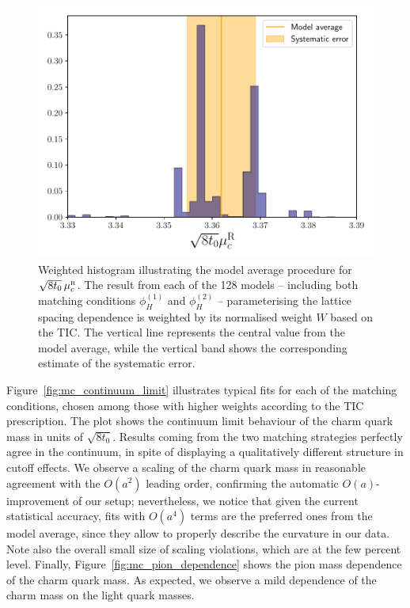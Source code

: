 \begin{figure}[!htb]
	\centering
	\includegraphics[scale=0.65]{./cap6/figs/mc/hist_muc.pdf}
	\caption{Weighted histogram illustrating the model average procedure for $\sqrt{8t_0}\,\mu_c^{\rm\scriptscriptstyle R}$. The result from each of the 128 models -- including both matching conditions $\phi_H^{(1)}$ and $\phi_H^{(2)}$ -- parameterising the lattice spacing dependence is weighted by its normalised weight $W$ based on the TIC. The vertical line represents the central value from the model average, while the vertical band shows the corresponding estimate of the systematic error.            }
	\label{fig:mc_histogram}
\end{figure}

Figure~\ref{fig:mc_continuum_limit} illustrates typical fits for each of the matching conditions, chosen 
among those with higher weights according to the TIC prescription. The plot shows  the continuum limit behaviour of 
the charm quark mass in units of $\sqrt{8t_0}$. Results coming from the two matching strategies perfectly 
agree in the continuum, in spite of displaying a qualitatively different structure in cutoff effects.
We observe a scaling of the charm quark mass in reasonable
agreement with the $O(a^2)$ leading order, confirming the automatic $O(a)$-improvement of our setup;
nevertheless, we notice that given the current statistical accuracy, fits with  $O(a^4)$ terms are the 
preferred ones from the model average, since they allow to properly describe the curvature in our data. 
Note also the overall small size of scaling violations, which are at the few percent level.
Finally, Figure~\ref{fig:mc_pion_dependence} shows the pion  mass dependence of the charm quark mass. As 
expected, we observe a mild dependence of the charm mass on the light quark masses.
 
